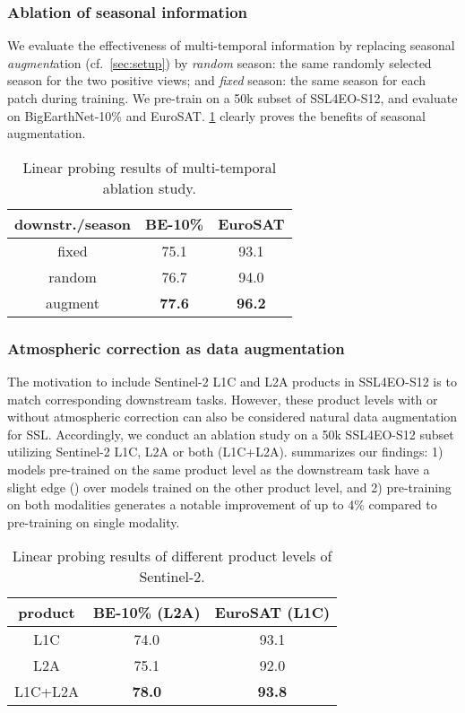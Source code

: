 \documentclass[lettersize,journal]{IEEEtran}
\begin{document}
\subsubsection{Ablation of seasonal information} We evaluate the effectiveness of multi-temporal information by replacing seasonal \textit{augment}ation (cf.\ \cref{sec:setup}) by \textit{random} season: the same randomly selected season for the two positive views; and \textit{fixed} season: the same season for each patch during training. We pre-train on a 50k subset of SSL4EO-S12, and evaluate on BigEarthNet-10\% and EuroSAT. \cref{tab:season} clearly proves the benefits of seasonal augmentation.
\vspace{-0.5em}
\begin{table}[h!]
\centering
\caption{Linear probing results of multi-temporal ablation study.}
\label{tab:season}
\begin{tabular}{ccc}
\hline
downstr./season & BE-10\%    & EuroSAT    \\ \hline \hline
fixed           & 75.1       & 93.1       \\
random          & 76.7 & 94.0 \\
augment         & \textbf{77.6} & \textbf{96.2} \\ \hline
\end{tabular}
\vspace{-1em}
\end{table} 


\subsubsection{Atmospheric correction as data augmentation} The motivation to include Sentinel-2 L1C and L2A products in SSL4EO-S12 is to match corresponding downstream tasks. However, these product levels with or without atmospheric correction can also be considered natural data augmentation for SSL. Accordingly, we conduct an ablation study on a 50k SSL4EO-S12 subset utilizing Sentinel-2 L1C, L2A or both (L1C+L2A).  summarizes our findings:
1) models pre-trained on the same product level as the downstream task have a slight edge () over models trained on the other product level, and 2) pre-training on both modalities generates a notable improvement of up to 4\% compared to pre-training on single modality.
\vspace{-0.5em}
\begin{table}[h!]
\caption{Linear probing results of different product levels of Sentinel-2.}
\label{tab:level}
\centering
\begin{tabular}{ccc}
\hline
product & BE-10\% (L2A)                        & EuroSAT (L1C)                        \\ \hline \hline
L1C     & 74.0                                 & 93.1                          \\
L2A     & 75.1                          & 92.0                                 \\
L1C+L2A & \textbf{78.0} & \textbf{93.8} \\ \hline
\end{tabular}
\end{table}
\end{document}
